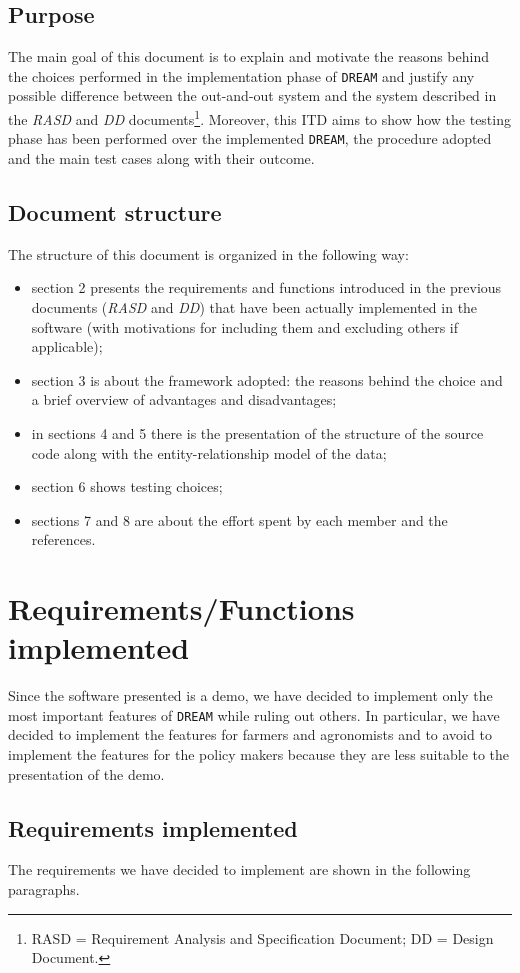 \documentclass{article}
\begin{document}
\subsection{Purpose}
The main goal of this document is to explain and motivate the reasons behind the choices performed in the implementation phase of \verb|DREAM| and justify any possible difference between the out-and-out system and the system described in the \textit{RASD} and \textit{DD} documents\footnote{RASD = Requirement Analysis and Specification
Document; DD = Design Document.}. Moreover, this ITD aims to show how the testing phase has been performed over the implemented \verb|DREAM|, the procedure adopted and the main test cases along with their outcome.
\subsection{Document structure}
The structure of this document is organized in the following way:
\begin{itemize}
    \item section 2 presents the requirements and functions introduced in the previous documents (\textit{RASD} and \textit{DD}) that have been actually implemented in the software (with
motivations for including them and excluding others if applicable);
\item section 3 is about the framework adopted: the reasons behind the choice and a brief overview of advantages and disadvantages;
\item in sections 4 and 5 there is the presentation of the structure of the source code along with the entity-relationship model of the data;
\item section 6 shows testing choices;
\item sections 7 and 8 are about the effort spent by each member and the references.
\end{itemize}
\newpage
\section{Requirements/Functions implemented}
Since the software presented is a demo, we have decided to implement only the most important features of \verb|DREAM| while ruling out others. In particular, we have decided to implement the features for farmers and agronomists and to avoid to implement the features for the policy makers because they are less suitable to the presentation of the demo.
\subsection{Requirements implemented}
The requirements we have decided to implement are shown in the following paragraphs.
\end{document}
